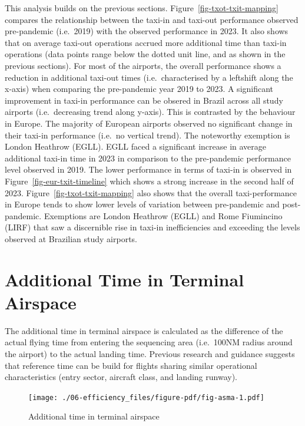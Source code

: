 \documentclass[
  a4paper,
  DIV=11,
  numbers=noendperiod]{scrreport}
\begin{document}
This analysis builds on the previous sections.
Figure~\ref{fig-txot-txit-mapping} compares the relationship between the
taxi-in and taxi-out performance observed pre-pandemic (i.e.~2019) with
the observed performance in 2023. It also shows that on average taxi-out
operations accrued more additional time than taxi-in operations (data
points range below the dotted unit line, and as shown in the previous
sections). For most of the airports, the overall performance shows a
reduction in additional taxi-out times (i.e.~characterised by a
leftshift along the x-axis) when comparing the pre-pandemic year 2019 to
2023. A significant improvement in taxi-in performance can be obsered in
Brazil across all study airports (i.e.~decreasing trend along y-axis).
This is contrasted by the behaviour in Europe. The majority of European
airports observed no significant change in their taxi-in performance
(i.e.~no vertical trend). The noteworthy exemption is London Heathrow
(EGLL). EGLL faced a significant increase in average additional taxi-in
time in 2023 in comparison to the pre-pandemic performance level
observed in 2019. The lower performance in terms of taxi-in is observed
in Figure~\ref{fig-eur-txit-timeline} which shows a strong increase in
the second half of 2023. Figure~\ref{fig-txot-txit-mapping} also shows
that the overall taxi-performance in Europe tends to show lower levels
of variation between pre-pandemic and post-pandemic. Exemptions are
London Heathrow (EGLL) and Rome Fiumincino (LIRF) that saw a discernible
rise in taxi-in inefficiencies and exceeding the levels observed at
Brazilian study airports.

\hypertarget{additional-time-in-terminal-airspace}{%
\section{Additional Time in Terminal
Airspace}\label{additional-time-in-terminal-airspace}}

The additional time in terminal airspace is calculated as the difference
of the actual flying time from entering the sequencing area (i.e.~100NM
radius around the airport) to the actual landing time. Previous research
and guidance suggests that reference time can be build for flights
sharing similar operational characteristics (entry sector, aircraft
class, and landing runway).

\begin{figure}[H]

{\centering \texttt{[image: ./06-efficiency\_files/figure-pdf/fig-asma-1.pdf]}

}

\caption{\label{fig-asma}Additional time in terminal airspace}

\end{figure}
\end{document}
